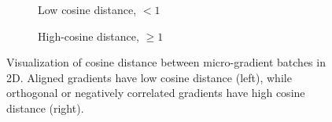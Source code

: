 \begin{figure}[ht!]
  \centering
  \begin{subfigure}{0.495\linewidth}
    \caption{Low cosine distance, $<1$}
    \label{fig:micrograd_aligned}
  \end{subfigure}
  \hfill
  \begin{subfigure}{0.495\linewidth}
    \caption{High-cosine distance, $\geq 1$}
    \label{fig:micrograd_misaligned}
  \end{subfigure}
  \caption{Visualization of cosine distance between micro-gradient batches in 2D. Aligned gradients have low cosine distance (left), while orthogonal or negatively correlated gradients have high cosine distance (right).}
  \label{fig:micrograd_visual}
\end{figure}

